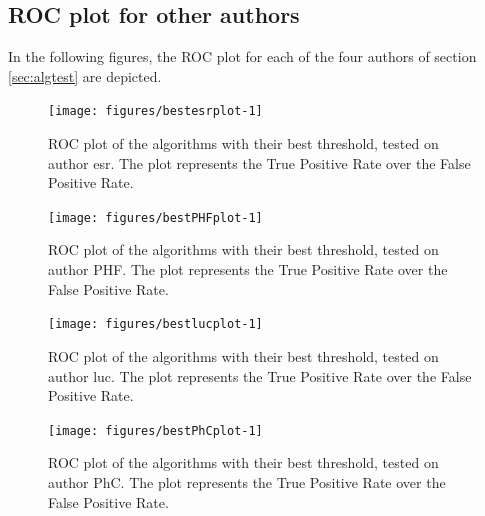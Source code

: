 \documentclass{article}\usepackage[]{graphicx}\usepackage[]{color}
\begin{document}
\subsection{\label{ssec:app:roc}ROC plot for other authors}
In the following figures, the ROC plot for each of the four authors of section {\ref{sec:algtest}} are depicted.
\begin{Schunk}
\begin{figure}
\texttt{[image: figures/bestesrplot-1]} \caption[ROC plot of the algorithms with their best threshold, tested on author esr]{ROC plot of the algorithms with their best threshold, tested on author esr. The plot represents the True Positive Rate over the False Positive Rate.}\label{fig:rocesrbestesrplot}
\end{figure}
\end{Schunk}
\FloatBarrier
\begin{Schunk}
\begin{figure}
\texttt{[image: figures/bestPHFplot-1]} \caption[ROC plot of the algorithms with their best threshold, tested on author PHF]{ROC plot of the algorithms with their best threshold, tested on author PHF. The plot represents the True Positive Rate over the False Positive Rate.}\label{fig:rocPHFbestPHFplot}
\end{figure}
\end{Schunk}
\begin{Schunk}
\begin{figure}
\texttt{[image: figures/bestlucplot-1]} \caption[ROC plot of the algorithms with their best threshold, tested on author luc]{ROC plot of the algorithms with their best threshold, tested on author luc. The plot represents the True Positive Rate over the False Positive Rate.}\label{fig:roclucbestlucplot}
\end{figure}
\end{Schunk}
\begin{Schunk}
\begin{figure}
\texttt{[image: figures/bestPhCplot-1]} \caption[ROC plot of the algorithms with their best threshold, tested on author PhC]{ROC plot of the algorithms with their best threshold, tested on author PhC. The plot represents the True Positive Rate over the False Positive Rate.}\label{fig:rocPhCbestPhCplot}
\end{figure}
\end{Schunk}
\FloatBarrier
\end{document}
